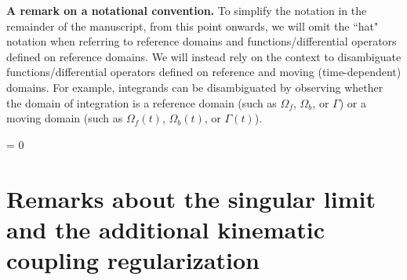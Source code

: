 \documentclass[11pt]{article}
\theoremstyle{definition}
\begin{document}
\medskip

\noindent \textbf{A remark on a notational convention.} To simplify the notation in the remainder of the manuscript, from this point onwards, we will omit the ``hat" notation when referring to reference domains and functions/differential operators defined on reference domains. We will instead rely on the context to disambiguate functions/differential operators defined on reference and moving (time-dependent) domains. For example, integrands can be disambiguated by observing whether the domain of integration is a reference domain (such as $\Omega_{f}$, $\Omega_{b}$, or $\Gamma$) or a moving domain (such as $\Omega_{f}(t)$, $\Omega_{b}(t)$, or $\Gamma(t)$). 

 = 0
\section{Remarks about the singular limit and the additional kinematic coupling regularization}
\end{document}
